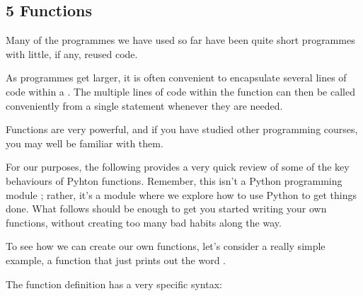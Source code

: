 \documentclass[letterpaper,10pt,english]{sphinxmanual}
\begin{document}
\subsection{5 Functions}
\label{\detokenize{content/03_Robot_Lab/Section_00_05:5-Functions}}\label{\detokenize{content/03_Robot_Lab/Section_00_05::doc}}

Many of the programmes we have used so far have been quite short programmes with little, if any, reused code.

As programmes get larger, it is often convenient to encapsulate several lines of code within a . The multiple lines of code within the function can then be called conveniently from a single statement whenever they are needed.

Functions are very powerful, and if you have studied other programming courses, you may well be familiar with them.

For our purposes, the following provides a very quick review of some of the key behaviours of Pyhton functions. Remember, this isn’t a Python programming module ; rather, it’s a module where we explore how to use Python to get things done. What follows should be enough to get you started writing your own functions, without creating too many bad habits along the way.

To see how we can create our own functions, let’s consider a really simple example, a function that just prints out the word .

The function definition has a very specific syntax:

\begin{sphinxVerbatim}[commandchars=\\\{\}]
 
\end{sphinxVerbatim}
\end{document}
